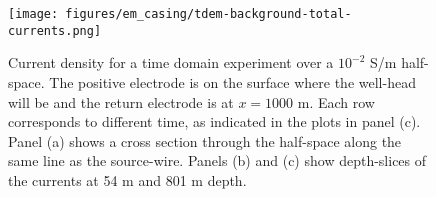 \begin{figure}
    \begin{center}
    \texttt{[image: figures/em\_casing/tdem-background-total-currents.png]}
    \end{center}
\caption{
    Current density for a time domain experiment over a $10^{-2}$ S/m half-space.
    The positive electrode is on the surface where the well-head will be and the return electrode is at $x=1000$ m. Each row corresponds to different time, as indicated in the plots in panel (c). Panel (a) shows a cross section through the half-space along the same line as the source-wire. Panels (b) and (c) show depth-slices of the currents at 54 m and 801 m depth.
}
\label{fig:tdem-background-total-currents}
\end{figure}



